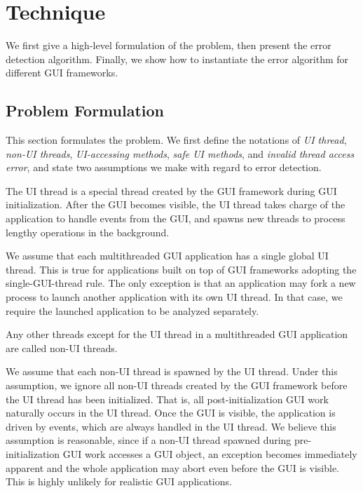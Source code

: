\section{Technique}
\label{sec:technique}

We first give a high-level formulation of the problem, then present
the error detection algorithm. Finally, we show how to instantiate
the error algorithm for different GUI frameworks.


\subsection{Problem Formulation}

This section formulates the problem. We first define the
notations of \textit{UI thread}, \textit{non-UI threads},
\textit{UI-accessing methods},
 \textit{safe UI methods}, and \textit{invalid thread access error}, and
state two assumptions we make with regard to error detection.

 {The UI thread
is a special thread created by the GUI framework during
GUI initialization. After the GUI becomes visible, the UI thread
takes charge of the application to handle events from the GUI,
and spawns new threads to process lengthy operations in the background. }\vspace{1mm}

 {We assume that each multithreaded
GUI application has a single global UI thread. This is true for applications
built on top of GUI frameworks adopting the single-GUI-thread rule. The
only exception is that 
 an application may fork a new process to launch another
application with its own UI thread. In that case, we require the
launched application to be analyzed separately.}\vspace{1mm}

 {Any other
threads except for the UI thread in a multithreaded GUI application
 are called non-UI threads.}\vspace{1mm}

 { We assume that each non-UI
thread is spawned by the UI thread. Under this assumption,
we ignore all non-UI threads created by the GUI framework
before the UI thread has been initialized. That is, all post-initialization
GUI work naturally occurs in the UI thread. Once the GUI is visible, the
application is driven by events, which are always handled in the UI thread.
We believe this assumption is reasonable, since if a non-UI thread 
spawned during pre-initialization GUI work accesses a GUI object, an exception becomes
immediately apparent and the whole application may abort even before the
GUI is visible. This is highly unlikely for realistic GUI
applications.
}\vspace{1mm}

